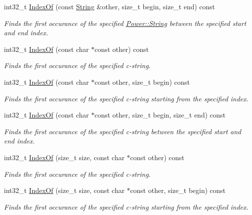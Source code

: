 \begin{DoxyCompactItemize}
int32\+\_\+t \hyperlink{class_power_1_1_string_a861bcfa1557e03e105a44cc5a4f1978a}{Index\+Of} (const \hyperlink{class_power_1_1_string}{String} \&other, size\+\_\+t begin, size\+\_\+t end) const
\begin{DoxyCompactList}\small\item\em Finds the first occurance of the specified \hyperlink{class_power_1_1_string}{Power\+::\+String} between the specified start and end index. \end{DoxyCompactList}\item 
int32\+\_\+t \hyperlink{class_power_1_1_string_aeb5a79a253d8d833b85bd2b8013db68a}{Index\+Of} (const char $\ast$const other) const
\begin{DoxyCompactList}\small\item\em Finds the first occurance of the specified c-\/string. \end{DoxyCompactList}\item 
int32\+\_\+t \hyperlink{class_power_1_1_string_a6b664e38ec1fd8f25754f8bf034e93bd}{Index\+Of} (const char $\ast$const other, size\+\_\+t begin) const
\begin{DoxyCompactList}\small\item\em Finds the first occurance of the specified c-\/string starting from the specified index. \end{DoxyCompactList}\item 
int32\+\_\+t \hyperlink{class_power_1_1_string_a39ce140c8be6329a036dd9a586d52b0d}{Index\+Of} (const char $\ast$const other, size\+\_\+t begin, size\+\_\+t end) const
\begin{DoxyCompactList}\small\item\em Finds the first occurance of the specified c-\/string between the specified start and end index. \end{DoxyCompactList}\item 
int32\+\_\+t \hyperlink{class_power_1_1_string_a691504e54435a9b9d8d92c4f558d5fa3}{Index\+Of} (size\+\_\+t size, const char $\ast$const other) const
\begin{DoxyCompactList}\small\item\em Finds the first occurance of the specified c-\/string. \end{DoxyCompactList}\item 
int32\+\_\+t \hyperlink{class_power_1_1_string_af5024bff0e32079d2afbfbc46646bbf2}{Index\+Of} (size\+\_\+t size, const char $\ast$const other, size\+\_\+t begin) const
\begin{DoxyCompactList}\small\item\em Finds the first occurance of the specified c-\/string starting from the specified index. \end{DoxyCompactList}\item 

\end{DoxyCompactItemize}
